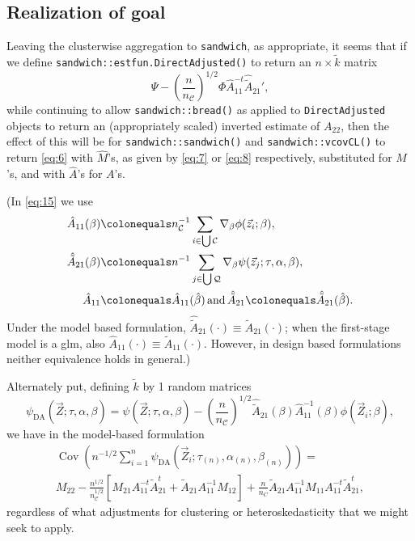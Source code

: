 \documentclass{article}
\newcommand{\defeq}{\ensuremath{\colonequals}}
\begin{document}
\subsection{Realization of goal}
Leaving the clusterwise aggregation to \texttt{sandwich}, as
appropriate, it seems that if we define
\texttt{sandwich::estfun.DirectAdjusted()} to return an $n \times \tilde{k}$ matrix
\begin{equation} \label{eq:15}
  \Psi -
  \left(\frac{n}{n_{\mathcal{C}}}\right)^{1/2}\Phi
  \hat{A}_{11}^{-t}\hat{\tilde{A}}_{21}', 
\end{equation}
while continuing to allow \texttt{sandwich::bread()} as applied to
\texttt{DirectAdjusted} objects to return an (appropriately scaled)
inverted estimate of $A_{22}$, then the effect of this will be for \texttt{sandwich::sandwich()}
and \texttt{sandwich::vcovCL()} to return \eqref{eq:6} with
$\hat{M}$'s,  as
given by \eqref{eq:7} or \eqref{eq:8} respectively, substituted for
$M$'s, and with $\hat{A}$'s for $A$'s.

(In \eqref{eq:15}
we use
\begin{align*}
  \hat{A}_{11}(\beta) &\defeq  n_{\mathcal{C}}^{-1}\sum_{i\in \bigcup
        \mathcal{C}}\nabla_{\beta}\phi(\vec{z}_{i};
        \beta ),\\
  \hat{\tilde{A}}_{21}(\beta) &\defeq n^{-1}\sum_{j\in \bigcup
        \mathcal{Q}}\nabla_{\beta}\psi(\vec{z}_{j};
        \tau, \alpha, \beta ),\\
  \hat{A}_{11}&\defeq \hat{A}_{11}(\hat\beta)\, \text{and}\, \hat{\tilde{A}}_{21}\defeq \hat{\tilde{A}}_{21}(\hat\beta).
\end{align*}
Under the model based
formulation, $\hat{\tilde{A}}_{21}(\cdot) \equiv \tilde{A}_{21}(\cdot)$; when the
first-stage model is a glm, also $\hat{A}_{11}(\cdot) \equiv
\tilde{A}_{11}(\cdot)$.  However, in design based formulations neither
equivalence holds in general.)

Alternately put,
defining $\tilde{k}$ by 1 random matrices 
\begin{equation}\label{eq:10}
    \psi_\text{DA}(\vec{Z}; \tau, \alpha, 
    \beta) = \psi (\vec{Z}; \tau,\alpha, 
    \beta) -
    \left(\frac{n}{n_{\mathcal{C}}}\right)^{1/2}
    \hat{\tilde{A}}_{21}(\beta) \hat{A}_{11}^{-1}(\beta)\phi(\vec{Z}_{i};
    \beta), 
\end{equation}
we have in the model-based formulation 
\begin{multline}
  \operatorname{Cov}\left(n^{-1/2}\sum_{i=1}^{n} \psi_\text{DA}(\vec{Z}_{i}; \tau_{(n)},\alpha_{(n)},
    \beta_{(n)})\right) = \\
  M_{22} -
                                 \frac{n^{1/2}}{n_{\mathcal{C}}^{1/2}}[M_{21}A_{11}^{-t}\tilde{A}_{21}^t
                                 + \tilde{A}_{21}A_{11}^{-1}M_{12}] +
                                 \frac{n}{n_C}\tilde{A}_{21}A_{11}^{-1}M_{11}A_{11}^{-t}\tilde{A}_{21}^{t}, \label{eq:12}
                               \end{multline}
regardless of what adjustments for
clustering or heteroskedasticity that we might seek to apply.
\end{document}
